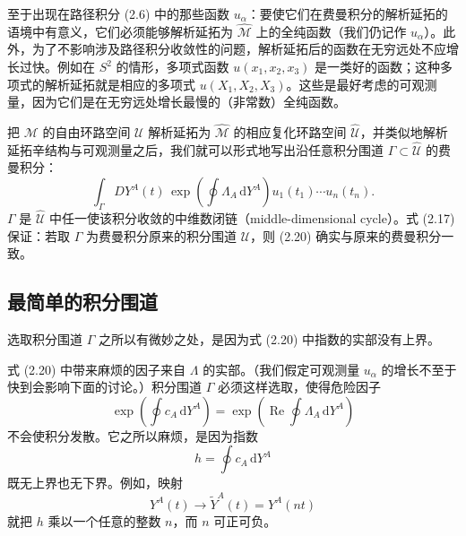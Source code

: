 \documentclass[11pt,a4paper,UTF8]{ctexart}
\theoremstyle{plain}
\theoremstyle{definition}
\begin{document}
至于出现在路径积分 (2.6) 中的那些函数 $u_\alpha$：要使它们在费曼积分的解析延拓的语境中有意义，它们必须能够解析延拓为 $\widehat{\mathcal{M}}$ 上的全纯函数（我们仍记作 $u_\alpha$）。此外，为了不影响涉及路径积分收敛性的问题，解析延拓后的函数在无穷远处不应增长过快。例如在 $S^2$ 的情形，多项式函数 $u(x_1,x_2,x_3)$ 是一类好的函数；这种多项式的解析延拓就是相应的多项式 $u(X_1,X_2,X_3)$。这些是最好考虑的可观测量，因为它们是在无穷远处增长最慢的（非常数）全纯函数。

把 $\mathcal{M}$ 的自由环路空间 $\mathcal{U}$ 解析延拓为 $\widehat{\mathcal{M}}$ 的相应复化环路空间 $\widehat{\mathcal{U}}$，并类似地解析延拓辛结构与可观测量之后，我们就可以形式地写出沿任意积分围道 $\Gamma\subset\widehat{\mathcal{U}}$ 的费曼积分：
\begin{equation}
    \int_{\Gamma}DY^A(t)\,\exp\left(\oint\Lambda_A\,\mathrm{d}Y^A\right)
    u_1(t_1)\cdots u_n(t_n).
    \tag{2.20}
\end{equation}
$\Gamma$ 是 $\widehat{\mathcal{U}}$ 中任一使该积分收敛的中维数闭链（middle-dimensional cycle）。式 (2.17) 保证：若取 $\Gamma$ 为费曼积分原来的积分围道 $\mathcal{U}$，则 (2.20) 确实与原来的费曼积分一致。




\subsection{最简单的积分围道}


选取积分围道 $\Gamma$ 之所以有微妙之处，是因为式 (2.20) 中指数的实部没有上界。

式 (2.20) 中带来麻烦的因子来自 $\Lambda$ 的实部。（我们假定可观测量 $u_\alpha$ 的增长不至于快到会影响下面的讨论。）积分围道 $\Gamma$ 必须这样选取，使得危险因子
\begin{equation}
    \exp\left(\oint c_A\,\mathrm{d}Y^A\right)
    = \exp\left(\operatorname{Re}\oint \Lambda_A\,\mathrm{d}Y^A\right)
    \tag{2.21}
\end{equation}
不会使积分发散。它之所以麻烦，是因为指数
\begin{equation}
    h=\oint c_A\,\mathrm{d}Y^A
    \tag{2.22}
\end{equation}
既无上界也无下界。例如，映射
\begin{equation}
    Y^A(t)\to\tilde{Y}^A(t)=Y^A(nt)
    \tag{2.23}
\end{equation}
就把 $h$ 乘以一个任意的整数 $n$，而 $n$ 可正可负。
\end{document}

